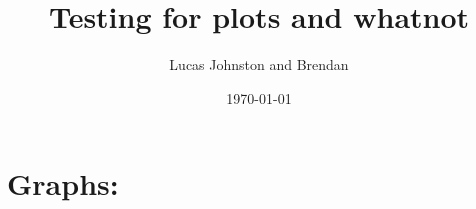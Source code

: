 \documentclass{article}
\title{Testing for plots and whatnot}
\author{Lucas Johnston and Brendan }
\date{\today}
\begin{document}
    \section*{Graphs:}
\end{document}

